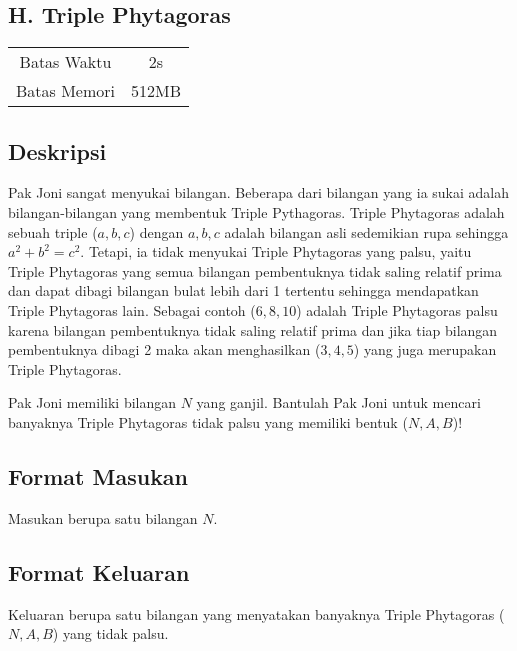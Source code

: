 \documentclass{article}
\begin{document}
\begin{center}
    \section*{H. Triple Phytagoras} %

    \begin{tabular}{ | c c | }
        \hline
        Batas Waktu  & 2s \\    %
        Batas Memori & 512MB \\  %
        \hline
    \end{tabular}
\end{center}

\subsection*{Deskripsi}

Pak Joni sangat menyukai bilangan. Beberapa dari bilangan yang ia sukai adalah bilangan-bilangan yang membentuk Triple Pythagoras. Triple Phytagoras adalah sebuah triple ($a, b, c$) dengan $a, b, c$ adalah bilangan asli sedemikian rupa sehingga $a^2 + b^2 = c^2$. Tetapi, ia tidak menyukai Triple Phytagoras yang palsu, yaitu Triple Phytagoras yang semua bilangan pembentuknya tidak saling relatif prima dan dapat dibagi bilangan bulat lebih dari 1 tertentu sehingga mendapatkan Triple Phytagoras lain. Sebagai contoh ($6, 8, 10$) adalah Triple Phytagoras palsu karena bilangan pembentuknya tidak saling relatif prima dan jika tiap bilangan pembentuknya dibagi 2 maka akan menghasilkan ($3, 4, 5$) yang juga merupakan Triple Phytagoras.

Pak Joni memiliki bilangan $N$ yang ganjil. Bantulah Pak Joni untuk mencari banyaknya Triple Phytagoras tidak palsu yang memiliki bentuk ($N, A, B$)!


\subsection*{Format Masukan}

Masukan berupa satu bilangan $N$.

\subsection*{Format Keluaran}

Keluaran berupa satu bilangan yang menyatakan banyaknya Triple Phytagoras ($N, A, B$) yang tidak palsu.
\\
\end{document}
